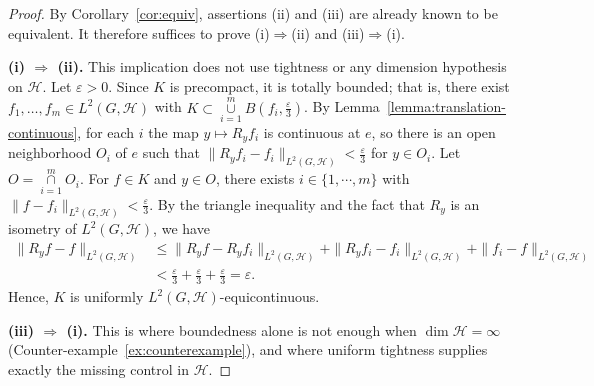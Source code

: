 \documentclass[10pt,a4paper]{amsart}
\def\union{\mathop{\cup }}
\def\inter{\mathop{\cap }}
\begin{document}
\begin{proof}
By Corollary~\ref{cor:equiv}, assertions (ii) and (iii) are already known to be equivalent. It
therefore suffices to prove (i)$\Rightarrow$(ii) and (iii)$\Rightarrow$(i).

\medskip
\noindent\textbf{(i) $\Rightarrow$ (ii).}
This implication does not use tightness or any dimension hypothesis on $\mathcal{H}$. Let $\varepsilon>0$. Since $K$ is precompact, it is totally bounded; that is,  there exist
$f_1,\dots,f_m\in L^2(G,\mathcal{H})$ with $K\subset\union\limits_{i=1}^mB(f_i,\frac{\varepsilon}{3})$. By
Lemma~\ref{lemma:translation-continuous}, for each $i$ the map $y\mapsto R_yf_i$
is continuous at $e$, so there is an open neighborhood $O_i$ of $e$ such that
$\|R_yf_i-f_i\|_{L^2(G,\mathcal{H})}<\frac{\varepsilon}{3}$ for $y\in O_i$. Let $O=\inter\limits_{i=1}^mO_i$.
For $f\in K$ and $y\in O$, there exists $i\in\{1,\cdots,m\}$ with $\|f-f_i\|_{L^2(G,\mathcal{H})}<\frac{\varepsilon}{3}$.
By the triangle inequality and the fact  that $R_y$ is an isometry of $L^2(G,\mathcal{H})$, we have
\begin{align*}
\|R_yf-f\|_{L^2(G,\mathcal{H})}&\le\|R_yf-R_yf_i\|_{L^2(G,\mathcal{H})}+\|R_yf_i-f_i\|_{L^2(G,\mathcal{H})}+
\|f_i-f\|_{L^2(G,\mathcal{H})}\\
&<\frac{\varepsilon}{3}+\frac{\varepsilon}{3}+\frac{\varepsilon}{3}=\varepsilon.
\end{align*}
Hence, $K$ is uniformly $L^2(G,\mathcal{H})$-equicontinuous.

\medskip
\noindent\textbf{(iii) $\Rightarrow$ (i).}
This is where boundedness alone is not enough when $\dim\mathcal{H}=\infty$
(Counter-example~\ref{ex:counterexample}), and where uniform tightness supplies exactly the missing control in $\mathcal{H}$.


\end{proof}
\end{document}
